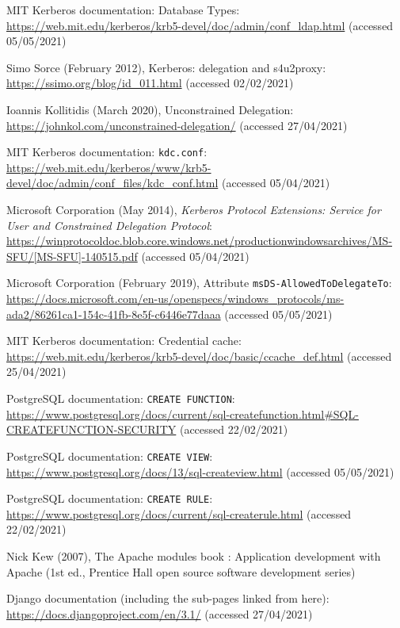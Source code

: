 \documentclass[12pt]{report}
\begin{document}
\begin{thebibliography}{99}
 MIT Kerberos documentation: Database Types: \url{https://web.mit.edu/kerberos/krb5-devel/doc/admin/conf_ldap.html} (accessed 05/05/2021)

 Simo Sorce (February 2012), Kerberos: delegation and s4u2proxy: \url{https://ssimo.org/blog/id_011.html} (accessed 02/02/2021)

 Ioannis Kollitidis (March 2020), Unconstrained Delegation: \url{https://johnkol.com/unconstrained-delegation/} (accessed 27/04/2021)

 MIT Kerberos documentation: \texttt{kdc.conf}: \url{https://web.mit.edu/kerberos/www/krb5-devel/doc/admin/conf_files/kdc_conf.html} (accessed 05/04/2021)

 Microsoft Corporation (May 2014), \textit{Kerberos Protocol Extensions: Service for User and Constrained Delegation Protocol}: \url{https://winprotocoldoc.blob.core.windows.net/productionwindowsarchives/MS-SFU/[MS-SFU]-140515.pdf} (accessed 05/04/2021)

 Microsoft Corporation (February 2019), Attribute \texttt{msDS-AllowedToDelegateTo}: \url{https://docs.microsoft.com/en-us/openspecs/windows_protocols/ms-ada2/86261ca1-154c-41fb-8e5f-c6446e77daaa} (accessed 05/05/2021)

 MIT Kerberos documentation: Credential cache: \url{https://web.mit.edu/kerberos/krb5-devel/doc/basic/ccache_def.html} (accessed 25/04/2021)

 PostgreSQL documentation: \texttt{CREATE FUNCTION}: \url{https://www.postgresql.org/docs/current/sql-createfunction.html#SQL-CREATEFUNCTION-SECURITY} (accessed 22/02/2021)

 PostgreSQL documentation: \texttt{CREATE VIEW}: \url{https://www.postgresql.org/docs/13/sql-createview.html} (accessed 05/05/2021)

 PostgreSQL documentation: \texttt{CREATE RULE}: \url{https://www.postgresql.org/docs/current/sql-createrule.html} (accessed 22/02/2021)

 Nick Kew (2007), The Apache modules book : Application development with Apache (1st ed., Prentice Hall open source software development series)

 Django documentation (including the sub-pages linked from here): \url{https://docs.djangoproject.com/en/3.1/} (accessed 27/04/2021)


\end{thebibliography}
\end{document}
